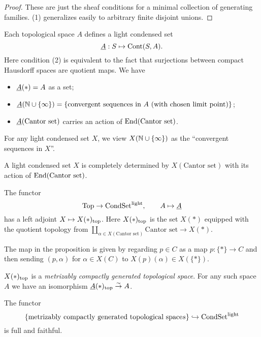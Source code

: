 \documentclass{notes}
\begin{document}
{\luca

\begin{proof}
	These are just the sheaf conditions for a minimal collection of generating families.
	(1) generalizes easily to arbitrary finite disjoint unions.
\end{proof}
}

\begin{example}
Each topological space $A$ defines a light condensed set 
$$
  \underline{A}: S\mapsto{\rm Cont}(S,A).
$$
Here condition (2) is equivalent to the fact that surjections between
compact Hausdorff spaces are quotient maps. We have
\begin{itemize}
\item $\underline{A}(*) = A$ as a set; 
\item $\underline{A}({\mathbb{N}}\cup\{\infty\}) = \{\text{convergent sequences in $A$
  (with chosen limit point)}\}$;
\item $\underline{A}(\text{Cantor set})$ carries an action of
  $\mathrm{ End}(\text{Cantor set})$. 
\end{itemize}
\end{example}

For any light condensed set $X$, we view $X({\mathbb{N}}\cup\{\infty\})$ as the
``convergent sequences in $X$''. 

\begin{remark}
A light condensed set $X$ is completely determined by $X(\text{Cantor
  set})$ with its action of $\mathrm{ End}(\text{Cantor set})$.
\end{remark}

\begin{prop}
The functor
$$
  \text{Top} \to \text{CondSet}^{\rm light},\qquad A\mapsto\underline{A}
$$
has a left adjoint $X\mapsto X(*)_{\rm top}$. Here $X(*)_{\rm top}$ is
the set $X(*)$ equipped with the quotient topology from
$\coprod_{\alpha\in X(\text{Cantor set})}\text{Cantor set} \to X(*)$.
\end{prop}
The map in the proposition is given by regarding $p\in C$ as a map $p\colon \{\ast\} \to C$ and then sending $(p,\alpha)$ for $\alpha\in X(C)$ to $X(p)(\alpha)\in X(\{\ast\})$.

\begin{remark}
$X(*)_{\rm top}$ is a {\em metrizably compactly generated topological
  space}. For any such space $A$ we have an isomorphism
  $\underline{A}(*)_{\rm top}\stackrel{\sim}\to A$. 
\end{remark}

\begin{cor}
The functor
$$
  \{\text{metrizably compactly generated topological space}s\} \hookrightarrow
  \text{CondSet}^{\rm light}
$$
is full and faithful. 
\end{cor}
\end{document}

